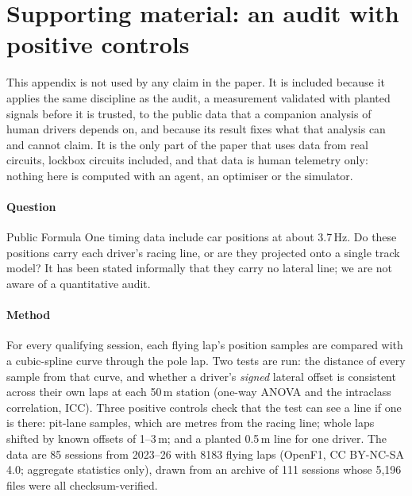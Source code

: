 \section{Supporting material: an audit with positive controls}
\label{app:snapping}

This appendix is not used by any claim in the paper. It is included because it applies the
same discipline as the audit, a measurement validated with planted signals before it is
trusted, to the public data that a companion analysis of human drivers depends on, and
because its result fixes what that analysis can and cannot claim. It is the only part of
the paper that uses data from real circuits, lockbox circuits included, and that data is
human telemetry only: nothing here is computed with an agent, an optimiser or the
simulator.

\paragraph{Question} Public Formula One timing data include car positions at about
3.7\,Hz. Do these positions carry each driver's racing line, or are they projected onto a
single track model? It has been stated informally that they carry no lateral line; we are
not aware of a quantitative audit.

\paragraph{Method} For every qualifying session, each flying lap's position samples are
compared with a cubic-spline curve through the pole lap. Two tests are run: the distance
of every sample from that curve, and whether a driver's \emph{signed} lateral offset is
consistent across their own laps at each 50\,m station (one-way ANOVA and the intraclass
correlation, ICC). Three positive controls check that the test can see a line if one is
there: pit-lane samples, which are metres from the racing line; whole laps shifted by known
offsets of 1--3\,m; and a planted 0.5\,m line for one driver.
The data are 85 sessions from 2023--26 with \num{8183} flying laps (OpenF1, CC BY-NC-SA
4.0; aggregate statistics only), drawn from an archive of 111 sessions whose 5,196 files
were all checksum-verified.

